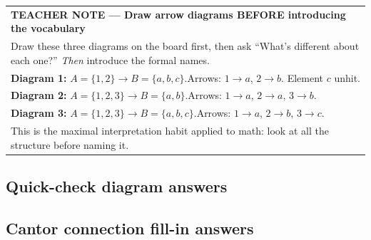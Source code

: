 \documentclass[11pt]{article}
\begin{document}
\medskip
\begin{tabular}{|p{\dimexpr\linewidth-2\tabcolsep-2\arrayrulewidth\relax}|}
\hline
{\small\bfseries\sffamily TEACHER NOTE --- Draw arrow diagrams BEFORE introducing the vocabulary}\\[3pt]
\small Draw these three diagrams on the board first, then ask ``What's different about each one?''
\emph{Then} introduce the formal names.\\[3pt]
\textbf{Diagram 1:} $A=\{1,2\}\to B=\{a,b,c\}$.\quad Arrows: $1\to a$, $2\to b$. Element $c$ unhit.\\[2pt]
\textbf{Diagram 2:} $A=\{1,2,3\}\to B=\{a,b\}$.\quad Arrows: $1\to a$, $2\to a$, $3\to b$.\\[2pt]
\textbf{Diagram 3:} $A=\{1,2,3\}\to B=\{a,b,c\}$.\quad Arrows: $1\to a$, $2\to b$, $3\to c$.\\[3pt]
This is the maximal interpretation habit applied to math: look at all the structure before naming it.\\[2pt]
\hline
\end{tabular}

\bigskip

\subsection*{Quick-check diagram answers}

\medskip\noindent{}

\bigskip

\subsection*{Cantor connection fill-in answers}
\end{document}
